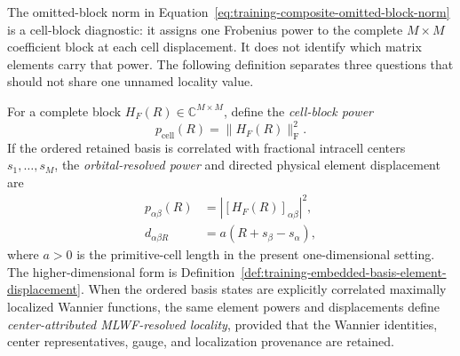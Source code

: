 The omitted-block norm in Equation~\eqref{eq:training-composite-omitted-block-norm}
is a cell-block diagnostic: it assigns one Frobenius power to the complete
$M\times M$ coefficient block at each cell displacement. It does not identify
which matrix elements carry that power. The following definition separates
three questions that should not share one unnamed locality value.

\begin{definition}
\label{def:training-hopping-locality-resolution}
For a complete block $H_F(R)\in\mathbb C^{M\times M}$, define the
\emph{cell-block power}
\begin{equation}
  p_{\mathrm{cell}}(R)=\lVert H_F(R)\rVert_{\mathrm F}^{2}.
  \label{eq:training-cell-block-hopping-power}
\end{equation}
If the ordered retained basis is correlated with fractional intracell centers
$s_1,\ldots,s_M$, the \emph{orbital-resolved power} and directed physical
element displacement are
\begin{align}
  p_{\alpha\beta}(R)
  &=\left|[H_F(R)]_{\alpha\beta}\right|^{2},
  \label{eq:training-orbital-resolved-hopping-power}\\
  d_{\alpha\beta R}
  &=a\left(R+s_\beta-s_\alpha\right),
  \label{eq:training-orbital-resolved-hopping-displacement}
\end{align}
where $a>0$ is the primitive-cell length in the present one-dimensional setting.
The higher-dimensional form is Definition~\ref{def:training-embedded-basis-element-displacement}.
When the ordered basis states are explicitly correlated maximally localized
Wannier functions, the same element powers and displacements define
\emph{center-attributed MLWF-resolved locality}, provided that the Wannier
identities, center representatives, gauge, and localization provenance are
retained.
\end{definition}

